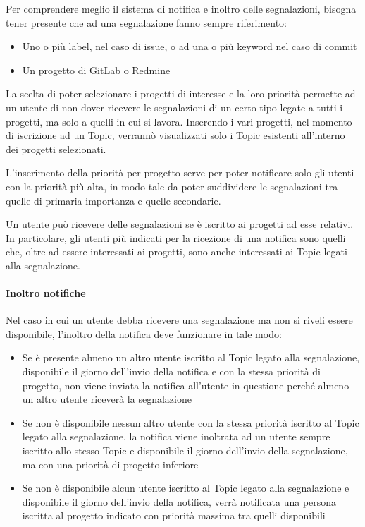     Per comprendere meglio il sistema di notifica e inoltro delle segnalazioni, bisogna tener presente che ad una segnalazione fanno sempre riferimento:
    \begin{itemize}
        \item Uno o più label, nel caso di issue, o ad una o più keyword nel caso di commit
        \item Un progetto di GitLab o Redmine
    \end{itemize}

    La scelta di poter selezionare i progetti di interesse e la loro priorità permette ad un utente di non dover ricevere le segnalazioni di un certo tipo legate a tutti i progetti, ma solo a quelli in cui si lavora. Inserendo i vari progetti, nel momento di iscrizione ad un Topic, verrannò visualizzati solo i Topic esistenti all'interno dei progetti selezionati. \par
    L'inserimento della priorità per progetto serve per poter notificare solo gli utenti con la priorità più alta, in modo tale da poter suddividere le segnalazioni tra quelle di primaria importanza e quelle secondarie.\par
    Un utente può ricevere delle segnalazioni se è iscritto ai progetti ad esse relativi. In particolare, gli utenti più indicati per la ricezione di una notifica sono quelli che, oltre ad essere interessati ai progetti, sono anche interessati ai Topic legati alla segnalazione.
        
    \paragraph{Inoltro notifiche}\label{InoltroNotifiche}
    Nel caso in cui un utente debba ricevere una segnalazione ma non si riveli essere disponibile, l'inoltro della notifica deve funzionare in tale modo:
    \begin{itemize}
        \item Se è presente almeno un altro utente iscritto al Topic legato alla segnalazione, disponibile il giorno dell'invio della notifica e con la stessa priorità di progetto, non viene inviata la notifica all'utente in questione perché almeno un altro utente riceverà la segnalazione
        \item Se non è disponibile nessun altro utente con la stessa priorità iscritto al Topic legato alla segnalazione, la notifica viene inoltrata ad un utente sempre iscritto allo stesso Topic e disponibile il giorno dell'invio della segnalazione, ma con una priorità di progetto inferiore
        \item Se non è disponibile alcun utente iscritto al Topic legato alla segnalazione e disponibile il giorno dell'invio della notifica, verrà notificata una persona iscritta al progetto indicato con priorità massima tra quelli disponibili
    \end{itemize}


